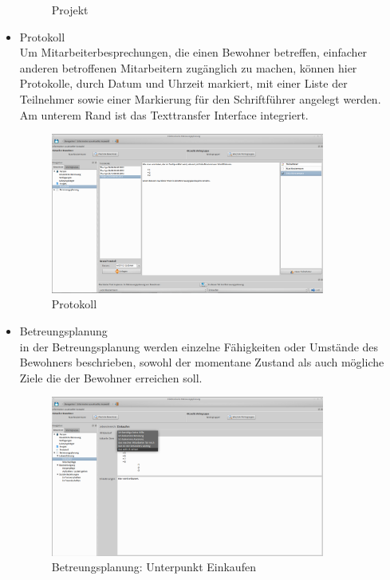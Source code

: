\begin{itemize}
\begin{figure}[h!]
\begin{center}
			\caption{Projekt}
		\end{center}
	\end{figure}
	\FloatBarrier
	\newpage
	\item Protokoll\mbox{}\\
	\noindent
	Um Mitarbeiterbesprechungen, die einen Bewohner betreffen, einfacher anderen betroffenen Mitarbeitern zugänglich zu machen, können hier Protokolle, durch Datum und Uhrzeit markiert, mit einer Liste der Teilnehmer sowie einer Markierung für den Schriftführer angelegt werden.\\Am unterem Rand ist das Texttransfer Interface integriert.
	\begin{figure}[h!]
		\begin{center}
			\includegraphics[keepaspectratio=true, width=0.85\textwidth]{pics/client_protokoll.png}
			\caption{Protokoll}
		\end{center}
	\end{figure}
	\FloatBarrier
	\newpage
	\item Betreungsplanung\mbox{}\\
	\noindent
	in der Betreungsplanung werden einzelne Fähigkeiten oder Umstände des Bewohners beschrieben, sowohl der momentane Zustand als auch mögliche Ziele die der Bewohner erreichen soll.
	\begin{figure}[h!]
		\begin{center}
			\includegraphics[keepaspectratio=true, width=0.85\textwidth]{pics/client_lebensfuehrung.png}
			\caption{Betreungsplanung: Unterpunkt Einkaufen}
		\end{center}
	\end{figure}
\end{itemize}
\newpage
